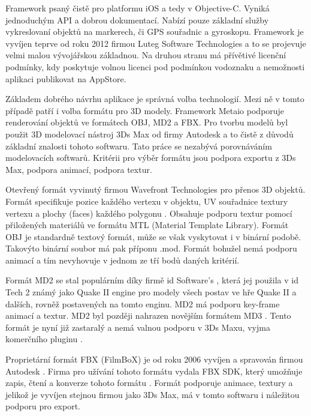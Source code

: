 \documentclass[twoside,12pt]{article}
\begin{document}
Framework psaný čistě pro platformu iOS a tedy v Objective-C. Vyniká jednoduchým API a dobrou dokumentací. Nabízí pouze základní služby vykreslovaní objektů na markerech, či GPS souřadnic a gyroskopu. Framework je vyvíjen teprve od roku 2012 firmou Luteg Software Technologies a to se projevuje velmi malou vývojářskou základnou. Na druhou stranu má přívětivé licenční podmínky, kdy poskytuje volnou licenci pod podmínkou vodoznaku a nemožnosti aplikaci publikovat na AppStore. 


% 
\newpage
{}
Základem dobrého návrhu aplikace je správná volba technologií. Mezi ně v tomto případě patří i volba formátu pro 3D modely. Framework Metaio podporuje renderování objektů ve formátech OBJ, MD2 a FBX. Pro tvorbu modelů byl použit 3D modelovací nástroj 3Ds Max od firmy Autodesk a to čistě z důvodů základní znalosti tohoto softwaru. Tato práce se nezabývá porovnáváním modelovacích softwarů. Kritérii pro výběr formátu jsou podpora exportu z 3Ds Max, podpora animací, podpora textur.

Otevřený formát vyvinutý firmou Wavefront Technologies pro přenos 3D objektů. Formát specifikuje pozice každého vertexu v objektu, UV souřadnice textury vertexu a plochy (faces) každého polygonu \cite{obj_wiki}. Obsahuje podporu textur pomocí přiložených materiálů ve formátu MTL (Material Template Library). Formát OBJ je standardně textový formát, může se však vyskytovat i v binární podobě. Takovýto binární soubor má pak příponu .mod. Formát bohužel nemá podporu animací \cite{obj_doc} a tím nevyhovuje v jednom ze tří bodů daných kritérií.

Formát MD2 se stal populárním díky firmě id Software's \cite{md2_wiki}, která jej použila v id Tech 2 známý jako Quake II engine \cite{quake_engine} pro modely všech postav ve hře Quake II a dalších, rovněž postavených na tomto enginu. MD2 má podporu key-frame animací a textur. MD2 byl později nahrazen novějším formátem MD3 \cite{id_tech_3_wiki}. Tento formát je nyní již zastaralý a nemá valnou podporu v 3Ds Maxu, vyjma komerčního pluginu \cite{qtip_plugin}. 

Proprietární formát FBX (FilmBoX) je od roku 2006 vyvíjen a spravován firmou Autodesk \cite{autodesk_fbx}. Firma pro užívání tohoto formátu vydala FBX SDK, který umožňuje zapis, čtení a konverze tohoto formátu \cite{autodesk_fbx_sdk}. Formát podporuje animace, textury a jelikož je vyvíjen stejnou firmou jako 3Ds Max, má v tomto softwaru i náležitou podporu pro export.
\end{document}
